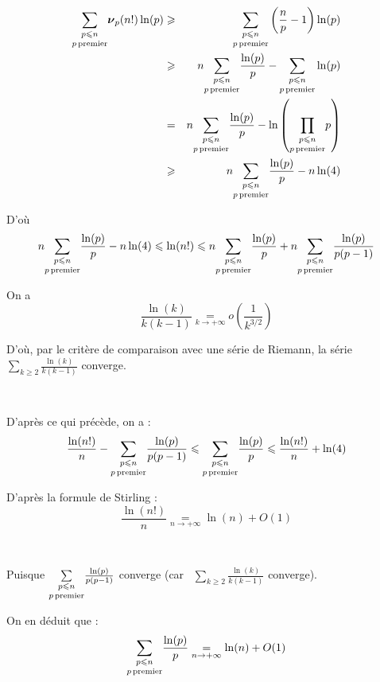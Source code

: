 \begin{eqnarray*}
  \underset{p \operatorname{premier}}{\underset{p \leqslant n}{\sum}} \boldsymbol{\nu}_p
  (n!) \ln (p) & \geqslant & \underset{p \operatorname{premier}}{\underset{p \leqslant
  n}{\sum}} \left( \frac{n}{p} - 1 \right) \ln (p)\\
  & \geqslant & n \underset{p \operatorname{premier}}{\underset{p \leqslant n}{\sum}}
  \frac{\ln (p)}{p} - \underset{p \operatorname{premier}}{\underset{p \leqslant
  n}{\sum}} \ln (p)\\
  & = & n \underset{p \operatorname{premier}}{\underset{p \leqslant n}{\sum}}
  \frac{\ln (p)}{p} - \ln \left( \underset{p \operatorname{premier}}{\underset{p
  \leqslant n}{\prod}} p \right)\\
  & \geqslant & n \underset{p \operatorname{premier}}{\underset{p \leqslant n}{\sum}}
  \frac{\ln (p)}{p} - n \ln (4)
\end{eqnarray*}


D'o{\`u}
\[ n \underset{p \operatorname{premier}}{\underset{p \leqslant n}{\sum}} \frac{\ln
   (p)}{p} - n \ln (4) \leqslant \ln (n!) \leqslant n \underset{p
   \operatorname{premier}}{\underset{p \leqslant n}{\sum}} \frac{\ln (p)}{p} + n
   \underset{p \operatorname{premier}}{\underset{p \leqslant n}{\sum}} \frac{\ln
   (p)}{p (p - 1)} \]


 On a
\[ \frac{\ln (k)}{k (k - 1)} \underset{k \rightarrow + \infty}{=} o \left(
   \frac{1}{k^{3 / 2}} \right) \]


D'o{\`u}, par le crit{\`e}re de comparaison avec une s{\'e}rie de Riemann, la
s{\'e}rie $\underset{k \geqslant 2}{\sum} \frac{\ln (k)}{k (k - 1)}$ converge.

\

 D'apr{\`e}s ce qui pr{\'e}c{\`e}de, on a :
\[ \frac{\ln (n!)}{n} - \underset{p \operatorname{premier}}{\underset{p \leqslant
   n}{\sum}} \frac{\ln (p)}{p (p - 1)} \leqslant \underset{p
   \operatorname{premier}}{\underset{p \leqslant n}{\sum}} \frac{\ln (p)}{p} \leqslant
   \frac{\ln (n!)}{n} + \ln (4) \]


D'apr{\`e}s la formule de Stirling :
\[ \frac{\ln (n!)}{n} \underset{n \rightarrow + \infty}{=} \ln (n) + O (1) \]


\

Puisque $\underset{p \operatorname{premier}}{\underset{p \leqslant n}{\sum}}
\frac{\ln (p)}{p (p - 1)} $ converge (car \ $\underset{k \geqslant 2}{\sum}
\frac{\ln (k)}{k (k - 1)}$ converge).

On en d{\'e}duit que :
\[ \underset{p \operatorname{premier}}{\underset{p \leqslant n}{\sum}} \frac{\ln
   (p)}{p} \underset{n \rightarrow + \infty}{=} \ln (n) + O (1) \]


